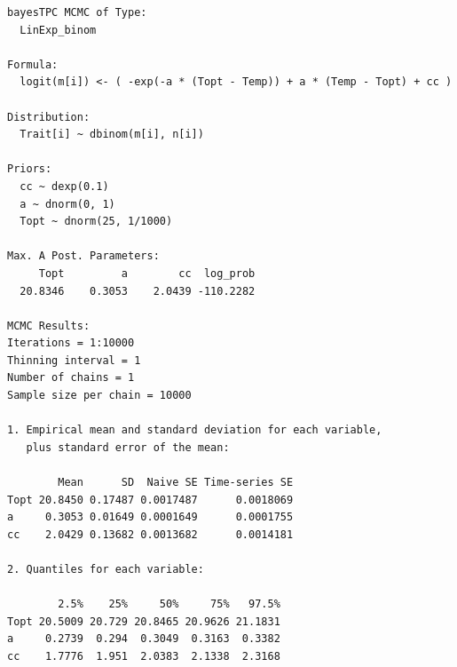 \documentclass[
]{article}
\begin{document}
\begin{verbatim}
bayesTPC MCMC of Type:
  LinExp_binom

Formula:
  logit(m[i]) <- ( -exp(-a * (Topt - Temp)) + a * (Temp - Topt) + cc )

Distribution:
  Trait[i] ~ dbinom(m[i], n[i])

Priors:
  cc ~ dexp(0.1) 
  a ~ dnorm(0, 1) 
  Topt ~ dnorm(25, 1/1000)

Max. A Post. Parameters: 
     Topt         a        cc  log_prob 
  20.8346    0.3053    2.0439 -110.2282 

MCMC Results:
Iterations = 1:10000
Thinning interval = 1 
Number of chains = 1 
Sample size per chain = 10000 

1. Empirical mean and standard deviation for each variable,
   plus standard error of the mean:

        Mean      SD  Naive SE Time-series SE
Topt 20.8450 0.17487 0.0017487      0.0018069
a     0.3053 0.01649 0.0001649      0.0001755
cc    2.0429 0.13682 0.0013682      0.0014181

2. Quantiles for each variable:

        2.5%    25%     50%     75%   97.5%
Topt 20.5009 20.729 20.8465 20.9626 21.1831
a     0.2739  0.294  0.3049  0.3163  0.3382
cc    1.7776  1.951  2.0383  2.1338  2.3168
\end{verbatim}
\end{document}
